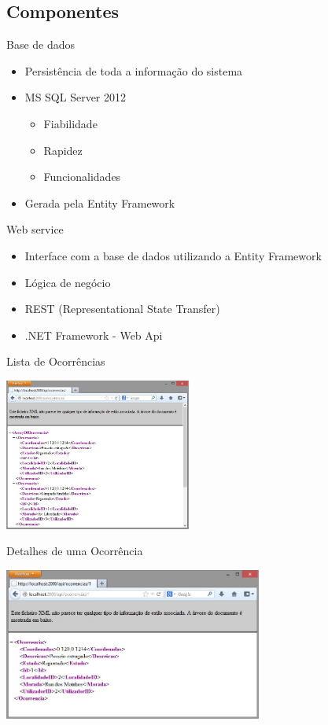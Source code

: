 \documentclass[portuges]{beamer}
\begin{document}
\subsection{Componentes}

\begin{frame}{Base de dados}
 \begin{itemize}
 \item Persistência de toda a informação do sistema
 \item MS SQL Server 2012
 \begin{itemize}
  \item Fiabilidade
  \item Rapidez
  \item Funcionalidades
 \end{itemize}
 \item Gerada pela Entity Framework
 \end{itemize}
\end{frame}

\begin{frame}{Web service}
 \begin{itemize}
 \item Interface com a base de dados utilizando a Entity Framework
 \item Lógica de negócio
 \item REST (Representational State Transfer)
 \item .NET Framework - Web Api 
 \end{itemize}
\end{frame}

\begin{frame}{Lista de Ocorrências}
 \begin{center}
  \includegraphics[height=5cm]{ocorrencias.jpg}
 \end{center}
\end{frame}

\begin{frame}{Detalhes de uma Ocorrência}
 \begin{center}
  \includegraphics[height=5cm]{ocorrencia.jpg}
 \end{center}
\end{frame}
\end{document}
